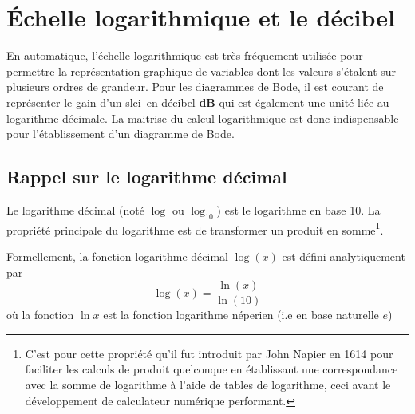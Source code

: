 \chapter{\'Echelle logarithmique et le décibel~\label{annexe-log}}

En automatique, l'échelle logarithmique est très fréquement 
utilisée pour permettre la représentation
graphique de variables dont les valeurs s'étalent sur plusieurs ordres 
de grandeur. Pour les diagrammes de Bode, il est courant de représenter le gain 
d'un \gls{slci}~en décibel \textbf{dB} qui est également une unité liée au 
logarithme décimale. La maitrise du calcul logarithmique est donc indispensable
pour l'établissement d'un diagramme de Bode.

\section{Rappel sur le logarithme décimal}
Le logarithme décimal (noté $\log$ ou $\log_{10}$) est le logarithme en base 10.
La propriété principale du logarithme est de transformer un produit en 
somme\footnote{C'est pour cette propriété qu'il fut introduit par John Napier 
en 1614 pour faciliter les calculs de produit quelconque en établissant une 
correspondance avec la somme de logarithme à l'aide de tables de logarithme, 
ceci avant le développement de calculateur numérique performant.}.

Formellement, la fonction logarithme décimal $\log{(x)}$ est défini 
analytiquement par 
$$
\log{(x)}=\dfrac{\ln{(x)}}{\ln{(10)}}
$$
où la fonction $\ln{x}$ est la fonction logarithme néperien (i.e en base 
naturelle $e$) 

